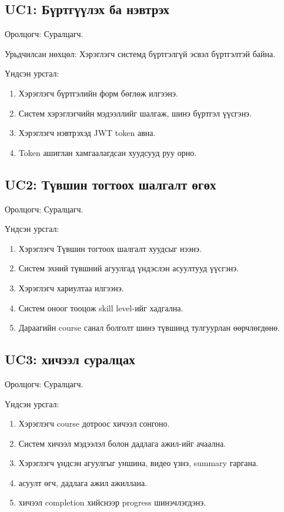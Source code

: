 \subsection{UC1: Бүртгүүлэх ба нэвтрэх}
Оролцогч: Суралцагч.

Урьдчилсан нөхцөл: Хэрэглэгч системд бүртгэлгүй эсвэл бүртгэлтэй байна.

Үндсэн урсгал:
\begin{enumerate}
\item Хэрэглэгч бүртгэлийн форм бөглөж илгээнэ.
\item Систем хэрэглэгчийн мэдээллийг шалгаж, шинэ бүртгэл үүсгэнэ.
\item Хэрэглэгч нэвтрэхэд JWT token авна.
\item Token ашиглан хамгаалагдсан хуудсууд руу орно.
\end{enumerate}

\subsection{UC2: Түвшин тогтоох шалгалт өгөх}
Оролцогч: Суралцагч.

Үндсэн урсгал:
\begin{enumerate}
\item Хэрэглэгч Түвшин тогтоох шалгалт хуудсыг нээнэ.
\item Систем эхний түвшний агуулгад үндэслэн асуултууд үүсгэнэ.
\item Хэрэглэгч хариултаа илгээнэ.
\item Систем оноог тооцож skill level-ийг хадгална.
\item Дараагийн course санал болголт шинэ түвшинд тулгуурлан өөрчлөгдөнө.
\end{enumerate}

\subsection{UC3: хичээл суралцах}
Оролцогч: Суралцагч.

Үндсэн урсгал:
\begin{enumerate}
\item Хэрэглэгч course дотроос хичээл сонгоно.
\item Систем хичээл мэдээлэл болон дадлага ажил-ийг ачаална.
\item Хэрэглэгч үндсэн агуулгыг уншина, видео үзнэ, summary гаргана.
\item асуулт өгч, дадлага ажил ажиллана.
\item хичээл completion хийснээр progress шинэчлэгдэнэ.
\end{enumerate}

